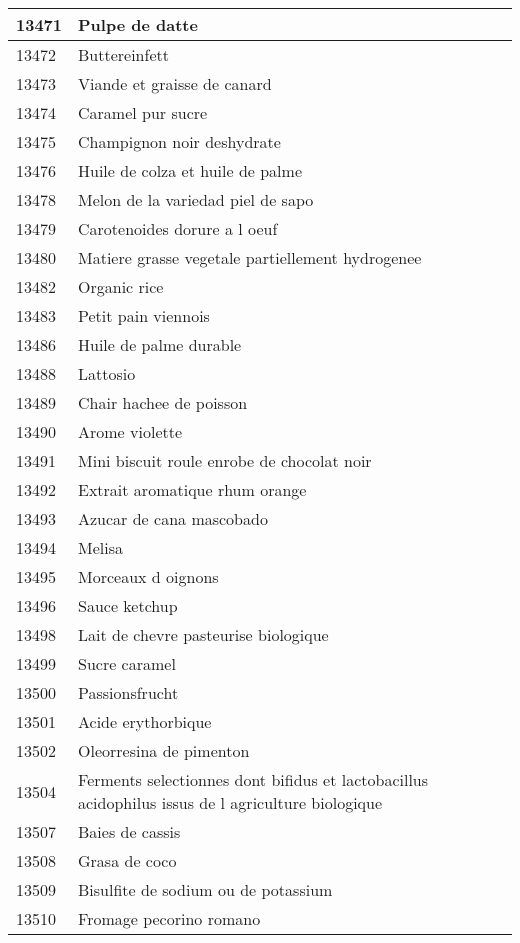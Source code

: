 \begin{longtable}{|l|l|}
13471 & Pulpe de datte \\ \hline 
13472 & Buttereinfett \\ \hline 
13473 & Viande et graisse de canard \\ \hline 
13474 & Caramel pur sucre \\ \hline 
13475 & Champignon noir deshydrate \\ \hline 
13476 & Huile de colza et huile de palme \\ \hline 
13478 & Melon de la variedad piel de sapo \\ \hline 
13479 & Carotenoides dorure a l oeuf \\ \hline 
13480 & Matiere grasse vegetale partiellement hydrogenee \\ \hline 
13482 & Organic rice \\ \hline 
13483 & Petit pain viennois \\ \hline 
13486 & Huile de palme durable \\ \hline 
13488 & Lattosio \\ \hline 
13489 & Chair hachee de poisson \\ \hline 
13490 & Arome violette \\ \hline 
13491 & Mini biscuit roule enrobe de chocolat noir \\ \hline 
13492 & Extrait aromatique rhum orange \\ \hline 
13493 & Azucar de cana mascobado \\ \hline 
13494 & Melisa \\ \hline 
13495 & Morceaux d oignons \\ \hline 
13496 & Sauce ketchup \\ \hline 
13498 & Lait de chevre pasteurise biologique \\ \hline 
13499 & Sucre caramel \\ \hline 
13500 & Passionsfrucht \\ \hline 
13501 & Acide erythorbique \\ \hline 
13502 & Oleorresina de pimenton \\ \hline 
13504 & Ferments selectionnes dont bifidus et lactobacillus acidophilus  issus de l agriculture biologique \\ \hline 
13507 & Baies de cassis \\ \hline 
13508 & Grasa de coco \\ \hline 
13509 & Bisulfite de sodium ou de potassium \\ \hline 
13510 & Fromage pecorino romano \\ \hline 

\end{longtable}
